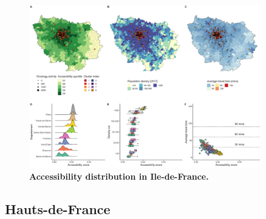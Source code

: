 \begin{figure}[H]
    \includegraphics[width=0.9\textwidth]{images/camion/region_accessibility/accessibility_Ile-de-France.png}
    \centering
    \caption{
        \textbf{Accessibility distribution in Ile-de-France.}
    }
\end{figure}

\subsection*{Hauts-de-France}

